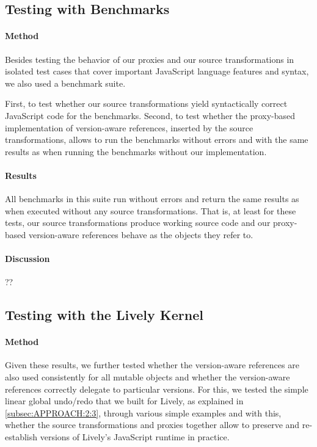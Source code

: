 
\subsection{Testing with Benchmarks}

\paragraph{Method}
Besides testing the behavior of our proxies and our source transformations in isolated test cases that cover important JavaScript language features and syntax, we also used a benchmark suite.

First, to test whether our source transformations yield syntactically correct JavaScript code for the benchmarks.
Second, to test whether the proxy-based implementation of version-aware references, inserted by the source transformations, allows to run the benchmarks without errors and with the same results as when running the benchmarks without our implementation.


\paragraph{Results}
All benchmarks in this suite run without errors and return the same results as when executed without any source transformations.
That is, at least for these tests, our source transformations produce working source code and our proxy-based version-aware references behave as the objects they refer to.

\paragraph{Discussion}
??


\subsection{Testing with the Lively Kernel}

\paragraph{Method}
Given these results, we further tested whether the version-aware references are also used consistently for all mutable objects and whether the version-aware references correctly delegate to particular versions.
For this, we tested the simple linear global undo/redo that we built for Lively, as explained in \ref{subsec:APPROACH:2:3}, through various simple examples and with this, whether the source transformations and proxies together allow to preserve and re-establish versions of Lively's JavaScript runtime in practice.

